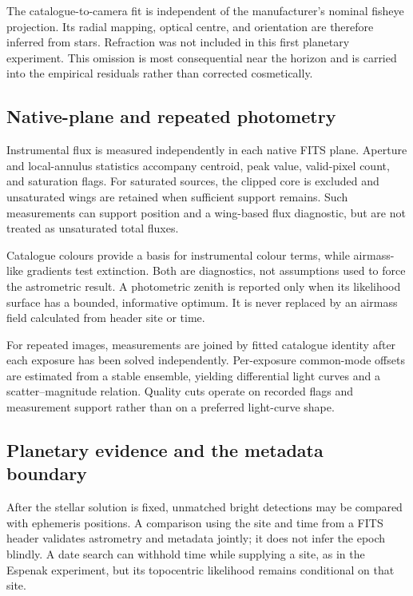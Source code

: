 \documentclass{aa}
\begin{document}
The catalogue-to-camera fit is independent of the manufacturer's nominal
fisheye projection. Its radial mapping, optical centre, and orientation are
therefore inferred from stars. Refraction was not included in this first
planetary experiment. This omission is most consequential near the horizon and
is carried into the empirical residuals rather than corrected cosmetically.

\subsection{Native-plane and repeated photometry}

Instrumental flux is measured independently in each native FITS plane.
Aperture and local-annulus statistics accompany centroid, peak value,
valid-pixel count, and saturation flags. For saturated sources, the clipped
core is excluded and unsaturated wings are retained when sufficient support
remains. Such measurements can support position and a wing-based flux
diagnostic, but are not treated as unsaturated total fluxes.

Catalogue colours provide a basis for instrumental colour terms, while
airmass-like gradients test extinction. Both are diagnostics, not assumptions
used to force the astrometric result. A photometric zenith is reported only
when its likelihood surface has a bounded, informative optimum. It is never
replaced by an airmass field calculated from header site or time.

For repeated images, measurements are joined by fitted catalogue identity
after each exposure has been solved independently. Per-exposure common-mode
offsets are estimated from a stable ensemble, yielding differential light
curves and a scatter--magnitude relation. Quality cuts operate on recorded
flags and measurement support rather than on a preferred light-curve shape.

\subsection{Planetary evidence and the metadata boundary}

After the stellar solution is fixed, unmatched bright detections may be
compared with ephemeris positions. A comparison using the site and time from a
FITS header validates astrometry and metadata jointly; it does not infer the
epoch blindly. A date search can withhold time while supplying a site, as in
the Espenak experiment, but its topocentric likelihood remains conditional on
that site.
\end{document}
